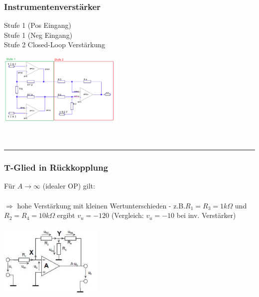 	\subsubsection{Instrumentenverstärker}
		\begin{minipage}[T]{13cm}
      Stufe 1 (Pos Eingang)
      \hspace{18.8mm}\\
      Stufe 1 (Neg Eingang)
      \hspace{18.3mm}\\
      Stufe 2 Closed-Loop Verst\"arkung
      \hspace{3.4mm}
		\end{minipage}
    \hspace{0.5cm}
		\begin{minipage}{6cm}
      \includegraphics[width=6cm]{./bilder/Instrumentationsverstaerker.png} 
    \end{minipage}\\
  
  \hrule
  \subsubsection{T-Glied in Rückkopplung}
    \begin{minipage}[c]{12cm}
  	 	Für $A \to \infty$ (idealer OP) gilt: \smallskip \\
   	 	\bigskip \\
   	 	$\Longrightarrow$ hohe Verstärkung mit kleinen Wertunterschieden - 
   	 	z.B.$R_1=R_3=1k\Omega$ und $R_2=R_4=10k\Omega$ ergibt $v_u=-120$ 
   	 	(Vergleich: $v_u=-10$ bei inv. Verstärker) \\
    \end{minipage}
    \hspace{0.5cm}
    \begin{minipage}[c]{5cm}
      \includegraphics[width=5cm]{./bilder/tglied.png}
    \end{minipage}      

